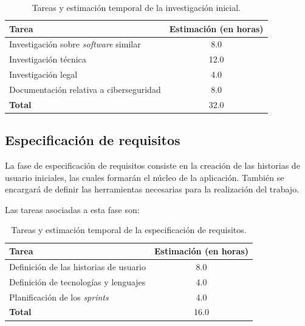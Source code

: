 \begin{table}[ht]
    \begin{center}
        \begin{tabular}{| l | c |}
            \hline
            \textbf{Tarea} & \textbf{Estimación} (en horas) \\
            \hline
            Investigación sobre \textit{software} similar & 8.0 \\ \hline
            Investigación técnica   & 12.0 \\ \hline
            Investigación legal     & 4.0 \\ \hline
            Documentación relativa a ciberseguridad & 8.0 \\ \hline
            \textbf{Total}          & 32.0 \\ \hline
        \end{tabular}
    \end{center}
    \caption{Tareas y estimación temporal de la investigación inicial.}
    \label{tab:phase1}
\end{table}

\subsection{Especificación de requisitos} \label{sub:requirements}

La fase de especificación de requisitos consiste en la creación de las historias de usuario iniciales, las cuales formarán el núcleo de la aplicación. También se encargará de definir las herramientas necesarias para la realización del trabajo.\sn

Las tareas asociadas a esta fase son:\sn

\begin{table}[ht]
    \begin{center}
        \begin{tabular}{| l | c |}
            \hline
            \textbf{Tarea} & \textbf{Estimación} (en horas) \\
            \hline
            Definición de las historias de usuario  & 8.0 \\ \hline
            Definición de tecnologías y lenguajes   & 4.0 \\ \hline
            Planificación de los \textit{sprints}   & 4.0 \\ \hline
            \textbf{Total}                          & 16.0 \\ \hline
        \end{tabular}
    \end{center}
    \caption{Tareas y estimación temporal de la especificación de requisitos.}
    \label{tab:phase2}
\end{table}

